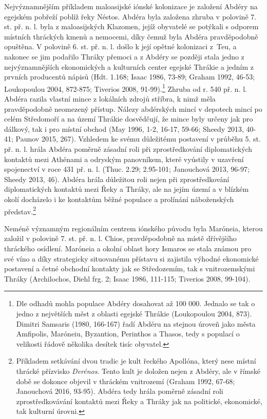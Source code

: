 Nejvýznamnějším příkladem maloasijské iónské kolonizace je založení Abdéry na egejském pobřeží poblíž řeky Néstos. Abdéra byla založena zhruba v polovině 7. st. př. n. l. byla z maloasijských Klazomen, jejíž obyvatelé se potýkali s odporem místních thráckých kmenů a nemocemi, díky čemuž byla Abdéra pravděpodobně opuštěna. V polovině 6. st. př. n. l. došlo k její opětné kolonizaci z~Teu, a nakonec se jim podařilo Thráky přemoci a z Abdéry se později stala jedno z nejvýznamnějších ekonomických a kulturních center egejské Thrákie a jedním z prvních producentů nápisů (Hdt. 1.168; Isaac 1986, 73-89; Graham 1992, 46-53; Loukopoulou 2004, 872-875; Tiverios 2008, 91-99).\footnote{Dle odhadů mohla populace Abdéry dosahovat až 100 000. Jednalo se tak o jedno z největších měst z oblasti egejské Thrákie (Loukopoulou 2004, 873). Dimitri Samsaris (1980, 166-167) řadí Abdéru na stejnou úroveň jako města Amfipolis, Maróneiu, Byzantion, Perinthos a Thasos, tedy s populací o velikosti řádově několika desítek tisíc obyvatel.} Zhruba od r. 540 př. n. l. Abdéra razila vlastní mince z lokálních zdrojů stříbra, k nimž měla pravděpodobně neomezený přístup. Nálezy abdérských mincí v depotech mincí po celém Středomoří a na území Thrákie dosvědčují, že mince byly určeny jak pro dálkový, tak i pro místní obchod (May 1996, 1-2, 16-17, 59-66; Sheedy 2013, 40-41; Paunov 2015, 267). Vzhledem ke svému důležitému postavení v průběhu 5. st. př. n. l. hrála Abdéra poměrně zásadní roli při zprostředkování diplomatických kontaktů mezi Athénami a odryským panovníkem, které vyústily v uzavření spojenectví v roce 431 př. n. l. (Thuc. 2.29; 2.95-101; Janouchová 2013, 96-97; Sheedy 2013, 46). Abdéra hrála důležitou roli nejen při zprostředkování diplomatických kontaktů mezi Řeky a Thráky, ale na jejím území a v blízkém okolí docházelo i ke kontaktům běžné populace a prolínání náboženských představ.\footnote{Příkladem setkávání dvou tradic je kult řeckého Apollóna, který nese místní thrácké přízvisko {\em Derénos}. Tento kult je doložen nejen z Abdéry, ale v římské době se dokonce objevil v thráckém vnitrozemí (Graham 1992, 67-68; Janouchová 2016, 93-95). Abdéra tedy hrála poměrně zásadní roli zprostředkovávání kontaktů mezi Řeky a Thráky jak na politické, ekonomické, tak kulturní úrovni.}

Neméně významným regionálním centrem iónského původu byla Maróneia, kterou založil v polovině 7. st. př. n. l. Chios, pravděpodobně na místě dřívějšího thráckého osídlení. Maróneia a okolní oblast hory Ismaros se stala známou pro své víno a díky strategicky situovanému přístavu si zajistila výhodné ekonomické postavení a četné obchodní kontakty jak se Středozemím, tak s vnitrozemskými Thráky (Archilochos, Diehl frg. 2; Isaac 1986, 111-115; Tiverios 2008, 99-104).

